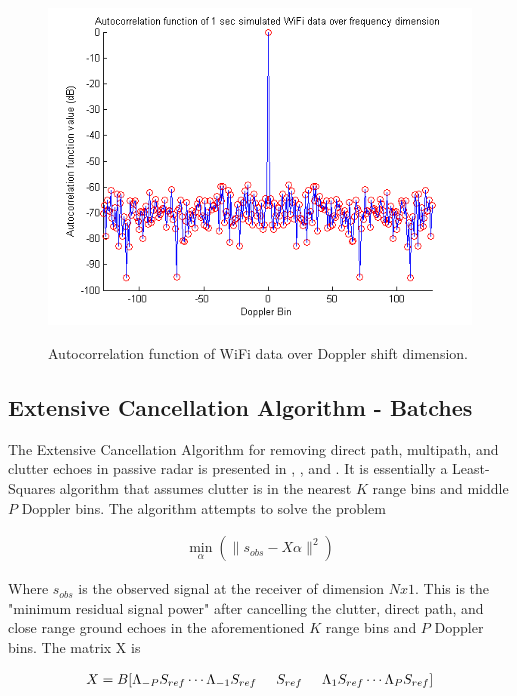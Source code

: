 \documentclass[article,11pt,onecolumn,final]{IEEEtran}
\begin{document}
\begin{figure}[H]
	\caption{Autocorrelation function of WiFi data over Doppler shift dimension.}
	\centering
	\includegraphics[width=400pt]{figures/autocorrdopp.png}
	\label{fig:autocorrdopp}
\end{figure}

\subsection{Extensive Cancellation Algorithm - Batches}

The Extensive Cancellation Algorithm for removing direct path, multipath, and clutter echoes in passive radar is presented in \cite{Colone2006}, \cite{Colone2009}, and \cite{Colone2012}. It is essentially a Least-Squares algorithm that assumes clutter is in the nearest $K$ range bins and middle $P$ Doppler bins. The algorithm attempts to solve the problem

\begin{align*}
 \min_{\alpha}(\|s_{obs} - X\alpha\|^2) 
\end{align*}

Where $s_{obs}$ is the observed signal at the receiver of dimension $N x 1$. This is the "minimum residual signal power" after cancelling the clutter, direct path, and close range ground echoes in the aforementioned $K$ range bins and $P$ Doppler bins. The matrix X is

\begin{align*}
X = B[\Lambda_{-P}S_{ref} \cdots \Lambda_{-1}S_{ref} \hspace{5 mm} S_{ref} \hspace{5mm} \Lambda_{1}S_{ref} \cdots \Lambda_{P}S_{ref}]
\end{align*}
\end{document}
